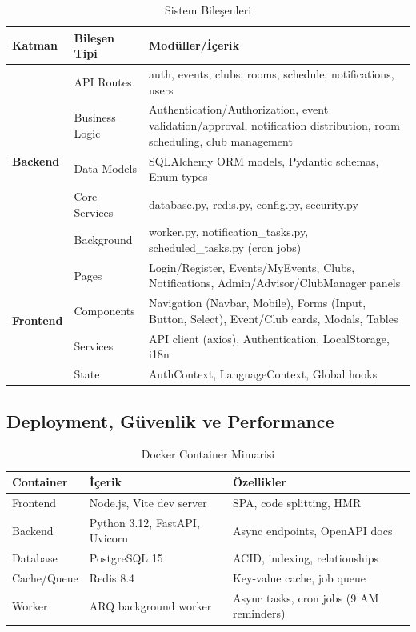 \documentclass[a4paper,12pt]{report}
\begin{document}
\begin{table}[h]
\centering
\scriptsize
\begin{tabular}{|l|l|p{8.5cm}|}
\hline
\textbf{Katman} & \textbf{Bileşen Tipi} & \textbf{Modüller/İçerik} \\ \hline
\multirow{5}{*}{\textbf{Backend}}
& API Routes & auth, events, clubs, rooms, schedule, notifications, users \\ \cline{2-3}
& Business Logic & Authentication/Authorization, event validation/approval, notification distribution, room scheduling, club management \\ \cline{2-3}
& Data Models & SQLAlchemy ORM models, Pydantic schemas, Enum types \\ \cline{2-3}
& Core Services & database.py, redis.py, config.py, security.py \\ \cline{2-3}
& Background & worker.py, notification\_tasks.py, scheduled\_tasks.py (cron jobs) \\ \hline
\multirow{4}{*}{\textbf{Frontend}}
& Pages & Login/Register, Events/MyEvents, Clubs, Notifications, Admin/Advisor/ClubManager panels \\ \cline{2-3}
& Components & Navigation (Navbar, Mobile), Forms (Input, Button, Select), Event/Club cards, Modals, Tables \\ \cline{2-3}
& Services & API client (axios), Authentication, LocalStorage, i18n \\ \cline{2-3}
& State & AuthContext, LanguageContext, Global hooks \\ \hline
\end{tabular}
\caption{Sistem Bileşenleri}
\end{table}

\subsection{Deployment, Güvenlik ve Performance}

\begin{table}[h]
\centering
\scriptsize
\begin{tabular}{|l|p{5.5cm}|p{5.5cm}|}
\hline
\textbf{Container} & \textbf{İçerik} & \textbf{Özellikler} \\ \hline
Frontend & Node.js, Vite dev server & SPA, code splitting, HMR \\ \hline
Backend & Python 3.12, FastAPI, Uvicorn & Async endpoints, OpenAPI docs \\ \hline
Database & PostgreSQL 15 & ACID, indexing, relationships \\ \hline
Cache/Queue & Redis 8.4 & Key-value cache, job queue \\ \hline
Worker & ARQ background worker & Async tasks, cron jobs (9 AM reminders) \\ \hline
\end{tabular}
\caption{Docker Container Mimarisi}
\end{table}
\end{document}
